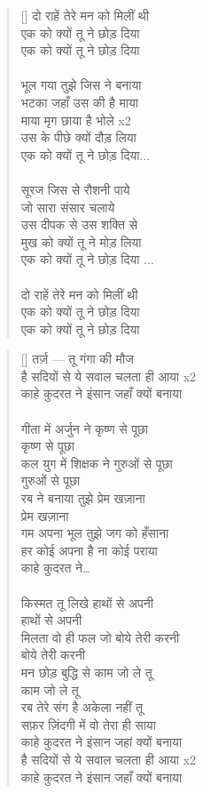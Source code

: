 \begin{verse}[\versewidth]\texthindi{
दो राहें तेरे मन को मिलीं थी\\
एक को क्यों तू ने छोड़ दिया\\
एक को क्यों तू ने छोड़ दिया\\
\\
भूल गया तुझे जिस ने बनाया\\
भटका जहाँ उस की है माया\\
माया मृग छाया है भोले x2\\
उस के पीछे क्यों दौड़ लिया\\
एक को क्यों तू ने छोड़ दिया...\\
\\
सूरज जिस से रौशनी पाये\\
जो सारा संसार चलाये\\
उस दीपक से उस शक्ति से\\
मुख को क्यों तू ने मोड़ लिया\\
एक को क्यों तू ने छोड़ दिया ...\\
\\
दो राहें तेरे मन को मिलीं थी\\
एक को क्यों तू ने छोड़ दिया\\
एक को क्यों तू ने छोड़ दिया
}
\end{verse}

\begin{verse}[\versewidth]\texthindi{
तर्ज़ — तू गंगा की मौज\\
है सदियों से ये सवाल चलता ही आया x2\\
काहे कुदरत ने इंसान जहाँ क्यों बनाया\\
\\
गीता में अर्जुन ने कृष्ण से पूछा\\
कृष्ण से पूछा\\
कल युग में शिक्षक ने गुरुओं से पूछा\\
गुरुओं से पूछा\\
रब ने बनाया तुझे प्रेम खज़ाना\\
प्रेम खज़ाना\\
गम अपना भूल तुझे जग को हँसाना\\
हर कोई अपना है ना कोई पराया\\
काहे कुदरत ने…\\
\\
किस्मत तू लिखे हाथों से अपनी\\
हाथों से अपनी\\
मिलता वो ही फल जो बोये तेरी करनी\\
बोये तेरी करनी\\
मन छोड़ बुद्धि से काम जो ले तू\\
काम जो ले तू\\
रब तेरे संग है अकेला नहीं तू\\
सफ़र ज़िंदगी में वो तेरा ही साया\\
काहे कुदरत ने इंसान जहां क्यों बनाया\\
है सदियों से ये सवाल चलता ही आया x2\\
काहे कुदरत ने इंसान जहाँ क्यों बनाया
}
\end{verse}
